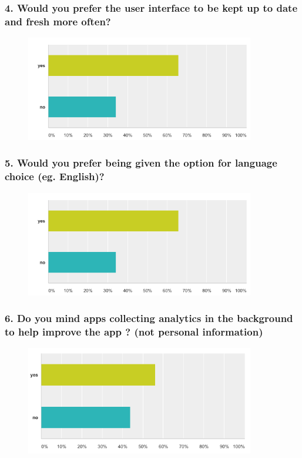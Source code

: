 \subsubsection{4. Would you prefer the user interface to be kept up to date and fresh more often?}

\begin{figure}[!h]
    \centering
    \includegraphics[width=100mm]{images/survey/updates}
    \label{fig:label}
\end{figure}

\subsubsection{5. Would you prefer being given the option for language choice (eg. English)?}

\begin{figure}[!h]
    \centering
    \includegraphics[width=100mm]{images/survey/language}
    \label{fig:label}
\end{figure}


\subsubsection{6. Do you mind apps collecting analytics in the background to help improve the app ? (not personal information)}

\begin{figure}[!h]
    \centering
    \includegraphics[width=100mm]{images/survey/analytics}
    \label{fig:label}
\end{figure}


